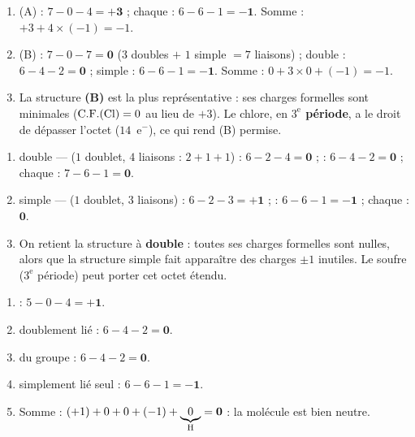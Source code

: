 \documentclass[11pt,a4paper]{article}
\begin{document}
\newcommand{\CF}{\ensuremath{\mathrm{C.F.}}}
\begin{corrige}
\begin{enumerate}[label=\alph*)]
  \item (A)  : $7 - 0 - 4 = \mathbf{+3}$ ; chaque  : $6 - 6 - 1 = \mathbf{-1}$.
        Somme : $+3 + 4\times(-1) = -1$. \checkmark
  \item (B)  : $7 - 0 - 7 = \mathbf{0}$ ($3$ doubles $+$ $1$ simple $= 7$ liaisons) ;
         double : $6 - 4 - 2 = \mathbf{0}$ ;  simple : $6 - 6 - 1 = \mathbf{-1}$.
        Somme : $0 + 3\times 0 + (-1) = -1$. \checkmark
  \item La structure \textbf{(B)} est la plus représentative : ses charges formelles sont
        minimales ($\CF(\ce{Cl})=0$ au lieu de $+3$). Le chlore, en \textbf{$3^{\text{e}}$
        période}, a le droit de dépasser l'octet ($14$~e$^-$), ce qui rend (B) permise.
\end{enumerate}
\end{corrige}

\begin{corrige}
\begin{enumerate}[label=\alph*)]
  \item {} double —  ($1$ doublet, $4$ liaisons : $2+1+1$) : $6-2-4 = \mathbf{0}$ ;
         : $6-4-2 = \mathbf{0}$ ; chaque  : $7-6-1 = \mathbf{0}$.
  \item {} simple —  ($1$ doublet, $3$ liaisons) : $6-2-3 = \mathbf{+1}$ ;
         : $6-6-1 = \mathbf{-1}$ ; chaque  : $\mathbf{0}$.
  \item On retient la structure à \textbf{ double} : toutes ses charges formelles sont
        nulles, alors que la structure simple fait apparaître des charges $\pm 1$ inutiles. Le
        soufre ($3^{\text{e}}$ période) peut porter cet octet étendu.
\end{enumerate}
\end{corrige}

\begin{corrige}
\begin{enumerate}[label=\alph*)]
  \item {} : $5 - 0 - 4 = \mathbf{+1}$.
  \item {} doublement lié : $6 - 4 - 2 = \mathbf{0}$.
  \item {} du groupe  : $6 - 4 - 2 = \mathbf{0}$.
  \item {} simplement lié seul : $6 - 6 - 1 = \mathbf{-1}$.
  \item Somme : $(+1) + 0 + 0 + (-1) + \underbrace{0}_{\ce{H}} = \mathbf{0}$ : la molécule est
        bien neutre. \checkmark
\end{enumerate}
\end{corrige}
\end{document}
